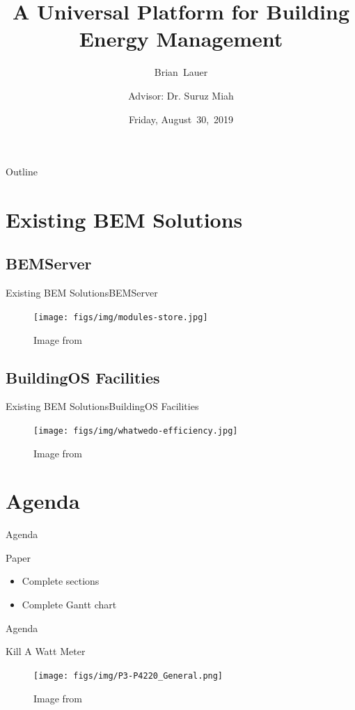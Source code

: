 \documentclass{beamer}
\title[Progress Update]{A Universal Platform for Building Energy Management}
\author[B.~Lauer]{Brian~Lauer \\\and
Advisor: Dr. Suruz Miah}
\institute[Bradley University] %
{
  Department of Electrical and Computer Engineering\\
  Bradley University\\
  1501 W. Bradley Avenue\\
  Peoria, IL, 61625, USA
}
\date[August~30,~2019]{Friday, August~30,~2019}
\begin{document}
\begin{frame}
  \titlepage
\end{frame}

\begin{frame}{Outline}
  \tableofcontents
\end{frame}

\section{Existing BEM Solutions}
\subsection{BEMServer}

\begin{frame}{Existing BEM Solutions}{BEMServer}
\begin{figure}
\texttt{[image: figs/img/modules-store.jpg]}
\caption{Image from \cite{nobatek2019}}
\end{figure}
\end{frame}

\subsection{BuildingOS Facilities}

\begin{frame}{Existing BEM Solutions}{BuildingOS Facilities}
\begin{figure}
\texttt{[image: figs/img/whatwedo-efficiency.jpg]}
\caption{Image from \cite{lucid2019}}
\end{figure}
\end{frame}

\section{Agenda}
\begin{frame}{Agenda}
\begin{block}{Paper}
\begin{itemize}
	\item Complete sections
	\item Complete Gantt chart
\end{itemize}
\end{block}
\end{frame}

\begin{frame}{Agenda}
\begin{block}{Kill A Watt Meter}
\begin{figure}
\texttt{[image: figs/img/P3-P4220\_General.png]}
\caption{Image from \cite{abcconf2019}}
\end{figure}
\end{block}
\end{frame}
\end{document}
